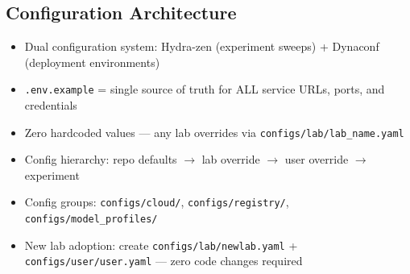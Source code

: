 
\subsection{Configuration Architecture}
\begin{itemize}
  \item Dual configuration system: Hydra-zen (experiment sweeps) + Dynaconf (deployment environments)
  \item \texttt{.env.example} = single source of truth for ALL service URLs, ports, and credentials
  \item Zero hardcoded values --- any lab overrides via \texttt{configs/lab/lab\_name.yaml}
  \item Config hierarchy: repo defaults $\to$ lab override $\to$ user override $\to$ experiment
  \item Config groups: \texttt{configs/cloud/}, \texttt{configs/registry/}, \texttt{configs/model\_profiles/}
  \item New lab adoption: create \texttt{configs/lab/newlab.yaml} + \texttt{configs/user/user.yaml}
        --- zero code changes required
\end{itemize}


